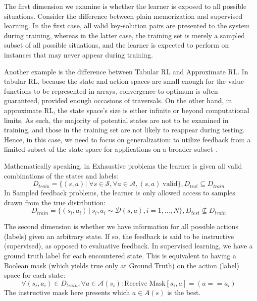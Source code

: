 \documentclass[11pt]{article}
\begin{document}
The first dimension we examine is whether the learner is exposed to all possible situations. Consider the difference between plain memorization and supervised learning. In the first case, all valid key-solution pairs are presented to the system during training, whereas in the latter case, the training set is merely a sampled subset of all possible situations, and the learner is expected to perform on instances that may never appear during training. 

Another example is the difference between Tabular RL and Approximate RL. In tabular RL, because the state and action spaces are small enough for the value functions to be represented in arrays, convergence to optimum is often guaranteed, provided enough occasions of traversals. On the other hand, in approximate RL, the state space's size is either infinite or beyond computational limits. As such, the majority of potential states are not to be examined in training, and those in the training set are not likely to reappear during testing. Hence, in this case, we need to focus on generalization: to utilize feedback from a limited subset of the state space for applications on a broader subset \cite{sutton_reinforcement_1998}.

Mathematically speaking, in Exhaustive problems the learner is given all valid combinations of the states and labels: 
\begin{equation}
    D_{train}=\{(s,a)\,|\,\forall s\in \mathcal{S}, \forall a \in \mathcal{A}, (s,a) \;\mathrm{valid}\}, D_{test} \subseteq D_{train}
\end{equation}
In Sampled feedback problems, the learner is only allowed access to samples drawn from the true distribution:
\begin{equation}
    D_{train}=\{(s_i,a_i)\,|\,s_i,a_i\sim \mathcal{D}(s,a),i=1,...,N\}, 
    D_{test}\nsubseteq D_{train}
\end{equation}

The second dimension is whether we have information for all possible actions (labels) given an arbitrary state. If so, the feedback is said to be instructive (supervised), as opposed to evaluative feedback. In supervised learning, we have a ground truth label for each encountered state. This is equivalent to having a Boolean mask (which yields true only at Ground Truth) on the action (label) space for each state:
\begin{equation}
    \forall (s_i,a_i)\in D_{train}, \forall a\in \mathcal{A}(s_i): \mathrm{Receive \;Mask}[s_i,a]=(a==a_i)
\end{equation}
The instructive mask here presents which $a\in A(s)$ is the best.
\end{document}
